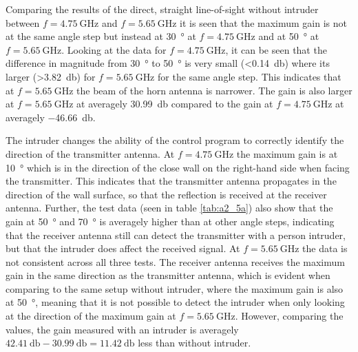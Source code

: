 Comparing the results of the direct, straight line-of-sight without intruder between $f=\SI{4.75}{\giga\hertz}$ and $f=\SI{5.65}{\giga\hertz}$ it is seen that the maximum gain is not at the same angle step but instead at \SI{30}{\degree} at $f=\SI{4.75}{\giga\hertz}$ and at \SI{50}{\degree} at $f=\SI{5.65}{\giga\hertz}$. Looking at the data for $f=\SI{4.75}{\giga\hertz}$, it can be seen that the difference in magnitude from \SI{30}{\degree} to \SI{50}{\degree} is very small (<\SI{0.14}{\decibel}) where its larger (>\SI{3.82}{\decibel}) for $f=\SI{5.65}{\giga\hertz}$ for the same angle step. This indicates that at $f=\SI{5.65}{\giga\hertz}$ the beam of the horn antenna is narrower. The gain is also larger at $f=\SI{5.65}{\giga\hertz}$ at averagely \SI{30.99}{\decibel} compared to the gain at $f=\SI{4.75}{\giga\hertz}$ at averagely \SI{-46.66}{\decibel}.

The intruder changes the ability of the control program to correctly identify the direction of the transmitter antenna. At $f=\SI{4.75}{\giga\hertz}$ the maximum gain is at \SI{10}{\degree} which is in the direction of the close wall on the right-hand side when facing the transmitter. This indicates that the transmitter antenna propagates in the direction of the wall surface, so that the reflection is received at the receiver antenna. Further, the test data (seen in table \ref{tab:a2_5a}) also show that the gain at \SI{50}{\degree} and \SI{70}{\degree} is averagely higher than at other angle steps, indicating that the receiver antenna still can detect the transmitter with a person intruder, but that the intruder does affect the received signal. At $f=\SI{5.65}{\giga\hertz}$ the data is not consistent across all three tests. The receiver antenna receives the maximum gain in the same direction as the transmitter antenna, which is evident when comparing to the same setup without intruder, where the maximum gain is also at \SI{50}{\degree}, meaning that it is not possible to detect the intruder when only looking at the direction of the maximum gain at $f=\SI{5.65}{\giga\hertz}$. However, comparing the values, the gain measured with an intruder is averagely $\SI{42.41}{\decibel}-\SI{30.99}{\decibel}=\SI{11.42}{\decibel}$ less than without intruder. 

